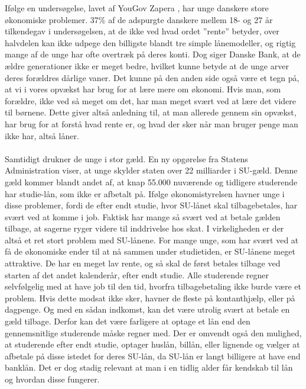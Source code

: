  Ifølge en undersøgelse, lavet af YouGov Zapera \cite{DanskeB1}, har unge danskere store økonomiske problemer. 37\% af de adspurgte danskere mellem 18- og 27 år tilkendegav i undersøgelsen, at de ikke ved hvad ordet ”rente” betyder, over halvdelen kan ikke udpege den billigste blandt tre simple lånemodeller, og rigtig mange af de unge har ofte overtræk på deres konti. Dog siger Danske Bank, at de ældre generationer ikke er meget bedre, hvilket kunne betyde at de unge arver deres forældres dårlige vaner. Det kunne på den anden side også være et tegn på, at vi i vores opvækst har brug for at lære mere om økonomi. Hvis man, som forældre, ikke ved så meget om det, har man meget svært ved at lære det videre til børnene. Dette giver altså anledning til, at man allerede gennem sin opvækst, har brug for at forstå hvad rente er, og hvad der sker når man bruger penge man ikke har, altså låner.    \\
\\
Samtidigt drukner de unge i stor gæld. En ny opgørelse fra Statens Administration viser, at unge skylder staten over 22 milliarder i SU-gæld. Denne gæld kommer blandt andet af, at knap 55.000 \cite{dr.dk} nuværende og tidligere studerende har studie-lån, som ikke er afbetalt på. Ifølge økonomistyrelsen havner unge i disse problemer, fordi de efter endt studie, hvor SU-lånet skal tilbagebetales, har svært ved at komme i job\cite{jobindex}. Faktisk har mange så svært ved at betale gælden tilbage, at sagerne ryger videre til inddrivelse hos skat\cite{BusinessDK1}. I virkeligheden er der altså et ret stort problem med SU-lånene. For mange unge, som har svært ved at få de økonomiske ender til at nå sammen under studietiden, er SU-lånene meget attraktive. De har en meget lav rente, og så skal de først betales tilbage ved starten af det andet kalenderår, efter endt studie. Alle studerende regner selvfølgelig med at have job til den tid, hvorfra tilbagebetaling ikke burde være et problem. Hvis dette modsat ikke sker, havner de fleste på kontanthjælp, eller på dagpenge. Og med en sådan indkomst, kan det være utrolig svært at betale en gæld tilbage. Derfor kan det være farligere at optage et lån end den gennemsnitlige studerende måske regner med. Der er omvendt også den mulighed, at studerende efter endt studie, optager huslån, billån, eller lignende og vælger at afbetale på disse istedet for deres SU-lån, da SU-lån er langt billigere at have end banklån. Det er dog stadig relevant at man i en tidlig alder får kendskab til lån og hvordan disse fungerer.  \\
